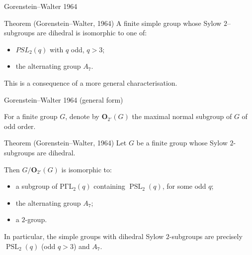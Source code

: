 \documentclass{beamer}
\DeclareMathOperator{\PSL}{PSL}
\newcommand{\PGammaL}{\mathrm{P\Gamma L}}
\newcommand{\Oodd}{\mathbf{O}_{2'}} %
\begin{document}
\begin{frame}{Gorenstein--Walter 1964}
\begin{block}{Theorem (Gorenstein--Walter, 1964)}
A finite simple group whose Sylow $2$--subgroups are dihedral is isomorphic to one of:
\begin{itemize}
  \item $PSL_2(q)$ with $q$ odd, $q>3$;
  \item the alternating group $A_7$.
\end{itemize}
\end{block}

\bigskip

This is a consequence of a more general characterisation.
\end{frame}

\begin{frame}{Gorenstein--Walter 1964 (general form)}

For a finite group $G$, denote by $\Oodd(G)$ the maximal normal subgroup of $G$ of odd order.

\bigskip

\begin{block}{Theorem (Gorenstein--Walter, 1964)}
Let $G$ be a finite group whose Sylow $2$-subgroups are dihedral.

\medskip

Then $G/\Oodd(G)$ is isomorphic to:

\smallskip

\begin{itemize}
  \item a subgroup of $\PGammaL_2(q)$ containing $\PSL_2(q)$, for some odd $q$;
  \item the alternating group $A_7$;
  \item a $2$-group.
\end{itemize}
\end{block}

In particular, the simple groups with dihedral Sylow $2$-subgroups are precisely $\PSL_2(q)$ (odd $q>3$) and $A_7$.
\end{frame}
\end{document}
